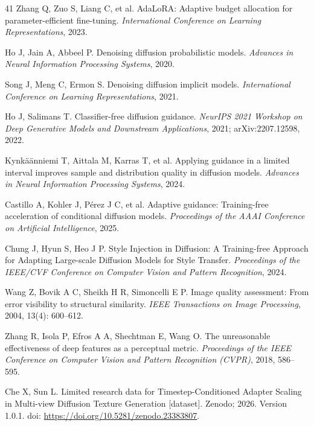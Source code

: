 \documentclass[times,twocolumn,final]{elsarticle}
\providecommand{\DIFaddend}{} %
\begin{document}
\begin{thebibliography}{41}
Zhang Q, Zuo S, Liang C, et al. AdaLoRA: Adaptive budget allocation for parameter-efficient fine-tuning. \textit{International Conference on Learning Representations}, 2023.

Ho J, Jain A, Abbeel P. Denoising diffusion probabilistic models. \textit{Advances in Neural Information Processing Systems}, 2020.

Song J, Meng C, Ermon S. Denoising diffusion implicit models. \textit{International Conference on Learning Representations}, 2021.

Ho J, Salimans T. Classifier-free diffusion guidance. \textit{NeurIPS 2021 Workshop on Deep Generative Models and Downstream Applications}, 2021; arXiv:2207.12598, 2022.

Kynk\"a\"anniemi T, Aittala M, Karras T, et al. Applying guidance in a limited interval improves sample and distribution quality in diffusion models. \textit{Advances in Neural Information Processing Systems}, 2024.

Castillo A, Kohler J, P\'erez J C, et al. Adaptive guidance: Training-free acceleration of conditional diffusion models. \textit{Proceedings of the AAAI Conference on Artificial Intelligence}, 2025.

Chung J, Hyun S, Heo J P. Style Injection in Diffusion: A Training-free Approach for Adapting Large-scale Diffusion Models for Style Transfer. \textit{Proceedings of the IEEE/CVF Conference on Computer Vision and Pattern Recognition}, 2024.

Wang Z, Bovik A C, Sheikh H R, Simoncelli E P. Image quality assessment: From error visibility to structural similarity. \textit{IEEE Transactions on Image Processing}, 2004, 13(4): 600--612.

Zhang R, Isola P, Efros A A, Shechtman E, Wang O. The unreasonable effectiveness of deep features as a perceptual metric. \textit{Proceedings of the IEEE Conference on Computer Vision and Pattern Recognition (CVPR)}, 2018, 586--595.

Che X, Sun L. Limited research data for Timestep-Conditioned Adapter Scaling in Multi-view Diffusion Texture Generation [dataset]. Zenodo; 2026. Version 1.0.1. doi: \url{https://doi.org/10.5281/zenodo.23383807}.

\end{thebibliography}
\endgroup
\DIFaddend
\end{document}
